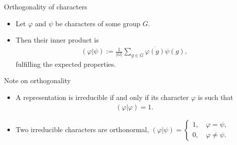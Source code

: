 \documentclass[10pt]{beamer}
\begin{document}
	\begin{frame}{Orthogonality of characters}		
		\begin{definition}\pause
			\begin{itemize}
				\item Let $\varphi$ and $\psi$ be characters of some group $G$.\pause
				\item Then their \alert{inner product} is \begin{align*}
					(\varphi|\psi) := \frac{1}{|G|}\sum_{g \in G}\overline{\varphi(g)}\psi(g),
				\end{align*}
				fulfilling the expected properties.\pause
			\end{itemize}
		\end{definition}
		
		\begin{block}{Note on orthogonality}
			\begin{itemize}
				\item A representation is irreducible if and only if its character $\varphi$ is such that \begin{align*}
				(\varphi|\varphi) = 1.
			\end{align*}\pause
			
				\item Two irreducible characters are orthonormal, $(\varphi|\psi) = \begin{cases}
						1, \quad \varphi = \psi, \\
						0, \quad \varphi \neq \psi.
					\end{cases}$
					
				
			\end{itemize}
		\end{block}
	\end{frame}
	
%			
%			
	
\end{document}
